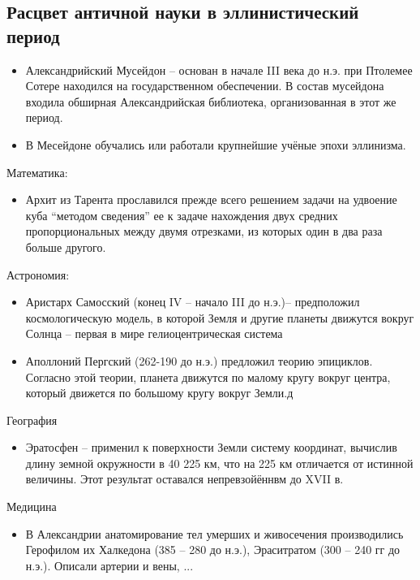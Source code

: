 \documentclass{book}
\theoremstyle{definition}
\begin{document}
    \subsection{Расцвет античной науки в эллинистический период}

    \begin{itemize}
        \item  Александрийский Мусейдон -- основан в начале III века до н.э. при Птолемее Сотере находился на государственном обеспечении. В состав мусейдона входила обширная Александрийская библиотека, организованная в этот же период.
        \item В Месейдоне обучались или работали крупнейшие учёные эпохи эллинизма.
    \end{itemize}

    Математика:
    \begin{itemize}
        \item  Архит из Тарента прославился прежде всего решением задачи на удвоение куба ``методом сведения'' ее к задаче нахождения двух средних пропорциональных между двумя отрезками, из которых один в два раза больше другого.
    \end{itemize}

    Астрономия:
    \begin{itemize}
        \item Аристарх Самосский (конец IV -- начало III до н.э.)-- предположил космологическую модель, в которой Земля и другие планеты движутся вокруг Солнца -- первая в мире гелиоцентрическая система
        \item Аполлоний Пергский (262-190 до н.э.) предложил теорию эпициклов. Согласно этой теории, планета движутся по малому кругу вокруг центра, который движется по большому кругу вокруг Земли.д
    \end{itemize}

    География
    \begin{itemize}
        \item  Эратосфен -- применил к поверхности Земли систему координат, вычислив длину земной окружности в 40 225 км, что на 225 км отличается от истинной величины. Этот результат оставался непревзойённвм до XVII в.
    \end{itemize}

    Медицина
    \begin{itemize}
        \item  В Александрии анатомирование тел умерших и живосечения производились Герофилом их Халкедона (385 -- 280 до н.э.), Эраситратом (300 -- 240 гг до н.э.). Описали артерии и вены, ...
    \end{itemize}
\end{document}

